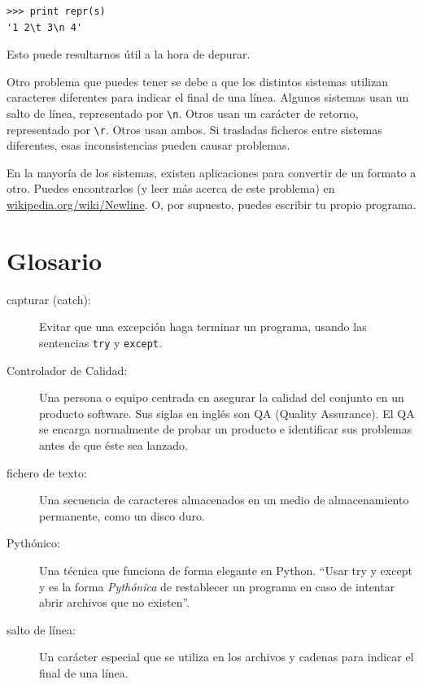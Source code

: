 \beforeverb
\begin{verbatim}
>>> print repr(s)
'1 2\t 3\n 4'
\end{verbatim}
\afterverb

Esto puede resultarnos útil a la hora de depurar.

Otro problema que puedes tener se debe a que los distintos sistemas
utilizan caracteres diferentes para indicar el final de una línea. Algunos
sistemas usan un salto de línea, representado por \verb"\n". Otros
usan un carácter de retorno, representado por \verb"\r". Otros usan ambos.
Si trasladas ficheros entre sistemas diferentes, esas inconsistencias
pueden causar problemas.


En la mayoría de los sistemas, existen aplicaciones para convertir de un
formato a otro. Puedes encontrarlos (y leer más acerca de este
problema) en \url{wikipedia.org/wiki/Newline}.  O, por supuesto, puedes
escribir tu propio programa.


\section{Glosario}

\begin{description}

\item[capturar (catch):] Evitar que una excepción haga terminar
un programa, usando las sentencias {\tt try} y {\tt except}.

\item[Controlador de Calidad:] Una persona o equipo centrada en asegurar
la calidad del conjunto en un producto software.
Sus siglas en inglés son QA (Quality Assurance). El QA se encarga normalmente
de probar un producto e identificar sus problemas antes de que éste
sea lanzado.

\item[fichero de texto:] Una secuencia de caracteres almacenados en un
medio de almacenamiento permanente, como un disco duro.

\item[Pythónico:] Una técnica que funciona de forma elegante en Python.
``Usar try y except y es la forma \emph{Pythónica} de restablecer un programa en
caso de intentar abrir archivos que no existen''.

\item[salto de línea:] Un carácter especial que se utiliza en los archivos y cadenas
para indicar el final de una línea.

\end{description}



